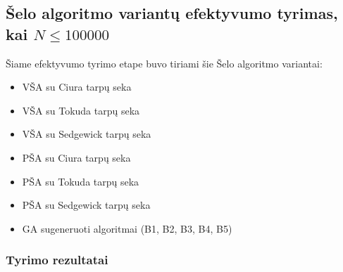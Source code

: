 \documentclass{VUMIFInfKursinis}
\begin{document}
\subsection{Šelo algoritmo variantų efektyvumo tyrimas, kai $N \leq 100000$}

Šiame efektyvumo tyrimo etape buvo tiriami šie Šelo algoritmo variantai:
\begin{itemize}
  \item VŠA su Ciura tarpų seka
  \item VŠA su Tokuda tarpų seka
  \item VŠA su Sedgewick tarpų seka
  \item PŠA su Ciura tarpų seka
  \item PŠA su Tokuda tarpų seka
  \item PŠA su Sedgewick tarpų seka
  \item GA sugeneruoti algoritmai (B1, B2, B3, B4, B5)
\end{itemize}

\subsubsection{Tyrimo rezultatai}
\end{document}
